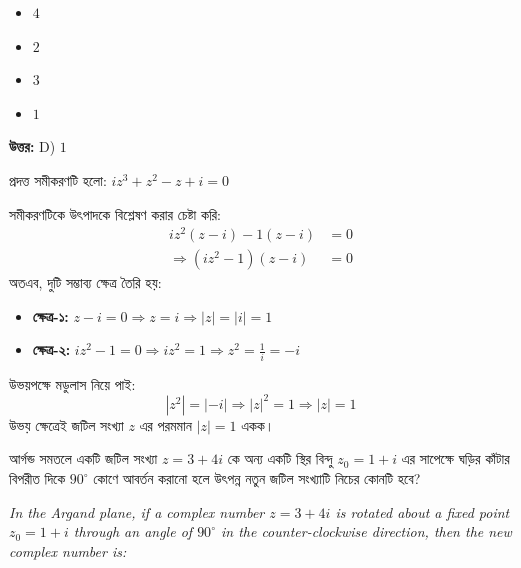 \documentclass[12pt, a4paper]{article}
\begin{document}
\begin{itemize}[label={}, leftmargin=1cm, itemsep=0.5em]
    \item[\textbf{A)}] $4$
    \item[\textbf{B)}] $2$
    \item[\textbf{C)}] $3$
    \item[\textbf{D)}] $1$
\end{itemize}

\vspace{0.5em}
\begin{tcolorbox}[answerbox]
    \textbf{\color{success} উত্তর:} D) $1$
\end{tcolorbox}
\vspace{1em}

\begin{tcolorbox}[solutionbox={সমাধান (Solution)}]
    \noindent
    প্রদত্ত সমীকরণটি হলো: $iz^3 + z^2 - z + i = 0$
    
    সমীকরণটিকে উৎপাদকে বিশ্লেষণ করার চেষ্টা করি:
    \begin{align*}
        iz^2(z - i) - 1(z - i) &= 0 \\
        \Rightarrow (iz^2 - 1)(z - i) &= 0
    \end{align*}
    অতএব, দুটি সম্ভাব্য ক্ষেত্র তৈরি হয়:
    \begin{itemize}
        \item \textbf{ক্ষেত্র-১:} $z - i = 0 \Rightarrow z = i \Rightarrow |z| = |i| = 1$
        \item \textbf{ক্ষেত্র-২:} $iz^2 - 1 = 0 \Rightarrow iz^2 = 1 \Rightarrow z^2 = \frac{1}{i} = -i$
    \end{itemize}
    উভয়পক্ষে মডুলাস নিয়ে পাই:
    \[ |z^2| = |-i| \Rightarrow |z|^2 = 1 \Rightarrow |z| = 1 \]
    উভয় ক্ষেত্রেই জটিল সংখ্যা $z$ এর পরমমান $|z| = 1$ একক।
\end{tcolorbox}
\begin{tcolorbox}[questionbox={প্রশ্ন (Question) 5}]
    \noindent
    আর্গন্ড সমতলে একটি জটিল সংখ্যা $z = 3+4i$ কে অন্য একটি স্থির বিন্দু $z_0 = 1+i$ এর সাপেক্ষে ঘড়ির কাঁটার বিপরীত দিকে $90^\circ$ কোণে আবর্তন করানো হলে উৎপন্ন নতুন জটিল সংখ্যাটি নিচের কোনটি হবে?
    
    \vspace{0.8em}
    \begin{english}
    \noindent\textit{\color{darkgray}
    In the Argand plane, if a complex number $z = 3+4i$ is rotated about a fixed point $z_0 = 1+i$ through an angle of $90^\circ$ in the counter-clockwise direction, then the new complex number is:
    }
    \end{english}
\end{tcolorbox}
\end{document}
